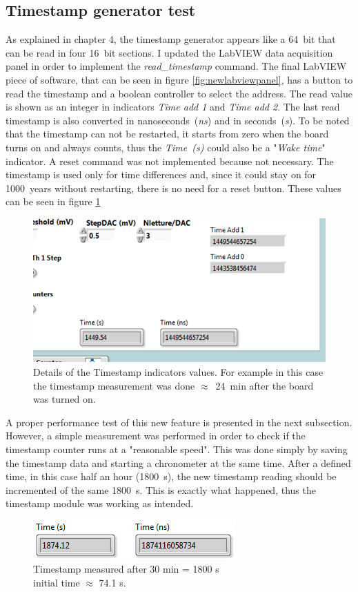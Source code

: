 \subsection{Timestamp generator test}
\noindent As explained in chapter 4, the timestamp generator appears like a 64~bit that can be read in four 16~bit sections.
I updated the LabVIEW data acquisition panel in order to implement the \textit{read\_timestamp} command.
The final LabVIEW piece of software, that can be seen in figure \ref{fig:newlabviewpanel}, has a button to read the timestamp and a boolean controller to select the address.
The read value is shown as an integer in indicators \textit{Time add 1} and \textit{Time add 2}. The last read timestamp is also converted in nanoseconds~(\textit{ns}) and in seconds~(\textit{s}).
To be noted that the timestamp can not be restarted, it starts from zero when the board turns on and always counts, thus the \textit{Time~(s)} could also be a "\textit{Wake time}" indicator. A reset command was not implemented because not necessary. The timestamp is used only for time differences and, since it could stay on for 1000~years without restarting, there is no need for a reset button. 
These values can be seen in figure \ref{fig:timestampfigure}
\begin{figure}[H]
	\centering
	\includegraphics[width=0.5\linewidth]{IMG/ch5/latch_tests/fig15.PNG}
	\caption{Details of the Timestamp indicators values. For example in this case the timestamp measurement was done $\approx$~24~min after the board was turned on.}
	\label{fig:timestampfigure}
\end{figure}
\noindent A proper performance test of this new feature is presented in the next subsection. However, a simple measurement was performed in order to check if the timestamp counter runs at a "reasonable speed".
This was done simply by saving the timestamp data and starting a chronometer at the same time. After a defined time, in this case half an hour (1800~s), the new timestamp reading should be incremented of the same 1800~s.
This is exactly what happened, thus the timestamp module was working as intended.  
\begin{figure}[H]
	\centering
	\includegraphics[width=0.35\linewidth]{IMG/ch5/latch_tests/fig20.PNG}
	\caption{Timestamp measured after 30 min = 1800 s\\initial time $\approx$ 74.1 s.}
	\label{fig:timestamptest}
\end{figure}

